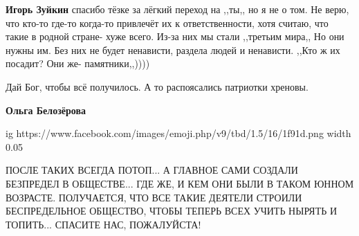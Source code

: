 \begin{itemize}
\begin{itemize}
 
\textbf{Игорь Зуйкин} спасибо тёзке за лёгкий переход на ,,ты,, но я не о том.
Не верю, что кто-то где-то когда-то привлечёт их к ответственности, хотя
считаю, что такие в родной стране- хуже всего. Из-за них мы стали ,,третьим
мира,, Но они нужны им. Без них не будет ненависти, раздела людей и ненависти.
,,Кто ж их посадит? Они же- памятники,,))))
\end{itemize}

 
Дай Бог, чтобы всё получилось. А то распоясались патриотки хреновы.

\begin{itemize}
 
\textbf{Ольга Белозёрова} 

\ifcmt
  ig https://www.facebook.com/images/emoji.php/v9/tbd/1.5/16/1f91d.png
  width 0.05
\fi

\end{itemize}

 

\obeycr
ПОСЛЕ ТАКИХ ВСЕГДА ПОТОП...
А ГЛАВНОЕ САМИ СОЗДАЛИ БЕЗПРЕДЕЛ В ОБЩЕСТВЕ... ГДЕ ЖЕ, И КЕМ ОНИ БЫЛИ В ТАКОМ ЮННОМ ВОЗРАСТЕ.
ПОЛУЧАЕТСЯ, ЧТО ВСЕ ТАКИЕ ДЕЯТЕЛИ СТРОИЛИ БЕСПРЕДЕЛЬНОЕ ОБЩЕСТВО, ЧТОБЫ ТЕПЕРЬ ВСЕХ УЧИТЬ НЫРЯТЬ И ТОПИТЬ...
СПАСИТЕ НАС, ПОЖАЛУЙСТА!
\restorecr

\begin{itemize}
 

\end{itemize}
\end{itemize}
